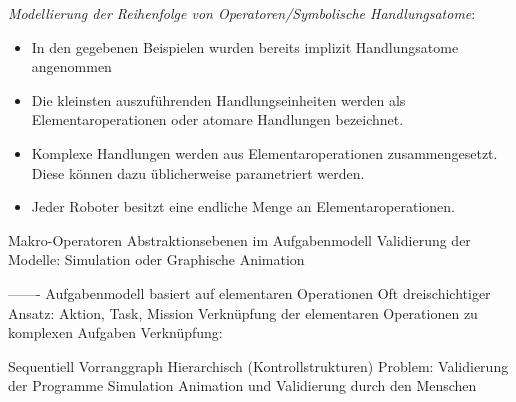 \textit{Modellierung der Reihenfolge von Operatoren/Symbolische Handlungsatome}:
\begin{itemize}
\item In den gegebenen Beispielen wurden bereits implizit Handlungsatome angenommen
\item Die kleinsten auszuführenden Handlungseinheiten werden als
Elementaroperationen oder atomare Handlungen bezeichnet.
\item Komplexe Handlungen werden aus Elementaroperationen zusammengesetzt. Diese
können dazu üblicherweise parametriert werden.
\item Jeder Roboter besitzt eine endliche Menge an Elementaroperationen.
\end{itemize}
Makro-Operatoren
Abstraktionsebenen im Aufgabenmodell
Validierung der Modelle: Simulation oder Graphische Animation

-------
Aufgabenmodell basiert auf elementaren Operationen
Oft dreischichtiger Ansatz: Aktion, Task, Mission
Verknüpfung der elementaren Operationen zu komplexen Aufgaben
Verknüpfung:

Sequentiell
Vorranggraph
Hierarchisch
(Kontrollstrukturen)
Problem: Validierung der Programme
Simulation
Animation und Validierung durch den Menschen
%